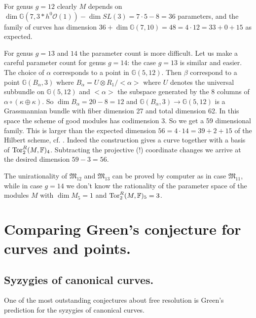 \documentclass[12pt,leqno]{amsart}
\newcommand{\FF}{{\mathbb F}}
\newcommand{\GG}{{\mathbb G}}
\newcommand{\Tor}{{\rm{Tor}}}
\newcommand{\ko}{{\mathcal O}}
\newcommand{\tensor}{\otimes}
\newlength{\ho}
\def\partitle#1{{\medskip\noindent {\bf #1.\hbox to 12pt{}}}} %
\newcommand{\gM}{\mathfrak M}
\begin{document}
\partitle{Counting parameters}
For genus $g=12$ clearly $M$ depends on 
$\dim\GG(7,3*h^0\ko(1))-\dim SL(3)= 7\cdot5-8=36$ parameters, 
and the family of curves has dimension $36+\dim\GG(7,10)=48=4\cdot12=33+0+15$
as expected. 

For genus $g=13$ and $14$ the parameter count is more difficult.
Let us make a careful parameter count for genus $g=14$: 
the case $g=13$ is similar and easier.
The choice of $\alpha$ corresponds to a point in $\GG(5,12)$.
Then $\beta$ correspond to a point $\GG(B_\alpha,3)$ where 
$B_\alpha = U \tensor R_1/<\alpha>$ where $U$ denotes
the universal subbundle on $\GG(5,12)$ and $<\alpha>$ 
the subspace generated by the 8 columns of $\alpha\circ(\kappa \oplus \kappa)$. 
So $\dim B_\alpha = 20-8=12$ and $\GG(B_\alpha,3) \to \GG(5,12)$ 
is a Grassmannian bundle with fiber dimension 27 and total dimension 62. 
In this space the scheme of good modules has codimension 3. 
So we get a 59 dimensional family. 
This is larger than the expected dimension $56=4\cdot 14=39+2+15$ 
of the Hilbert scheme, cf. \cite{Ha2}. 
Indeed the construction gives a curve together
with a basis of $\Tor_2^R(M,\FF)_4$. 
Subtracting the projective (!) coordinate changes we arrive at 
the desired dimension $59-3=56$. 

The unirationality of $\gM_{12}$ and $\gM_{13}$ can be proved by computer 
as in case $\gM_{11}$, 
while in case $g=14$ we don't know the rationality of 
the parameter space of the modules $M$ with 
$\dim M_5=1$ and $\Tor^R_2(M,\FF)_5=3$.






\section{Comparing Green's conjecture for curves and points.}

\subsection{Syzygies of canonical curves.}
One of the most outstanding conjectures about free resolution is 
Green's prediction
for the syzygies of canonical curves. 
\end{document}
